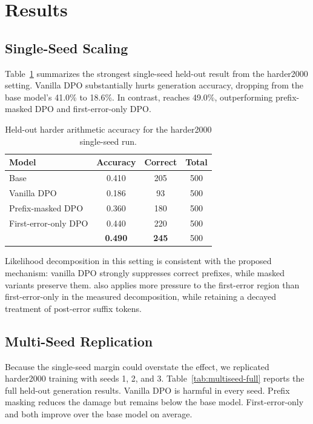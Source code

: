 \section{Results}

\subsection{Single-Seed Scaling}

Table~\ref{tab:single-seed} summarizes the strongest single-seed held-out result from the harder2000 setting. Vanilla DPO substantially hurts generation accuracy, dropping from the base model's 41.0\% to 18.6\%. In contrast, \cmdpo reaches 49.0\%, outperforming prefix-masked DPO and first-error-only DPO.

\begin{table}[t]
\caption{Held-out harder arithmetic accuracy for the harder2000 single-seed run.}
\label{tab:single-seed}
\begin{center}
\begin{tabular}{lccc}
\toprule
Model & Accuracy & Correct & Total \\
\midrule
Base & 0.410 & 205 & 500 \\
Vanilla DPO & 0.186 & 93 & 500 \\
Prefix-masked DPO & 0.360 & 180 & 500 \\
First-error-only DPO & 0.440 & 220 & 500 \\
\cmdpo{} & \textbf{0.490} & \textbf{245} & 500 \\
\bottomrule
\end{tabular}
\end{center}
\end{table}

Likelihood decomposition in this setting is consistent with the proposed mechanism: vanilla DPO strongly suppresses correct prefixes, while masked variants preserve them. \cmdpo also applies more pressure to the first-error region than first-error-only in the measured decomposition, while retaining a decayed treatment of post-error suffix tokens.

\subsection{Multi-Seed Replication}

Because the single-seed margin could overstate the effect, we replicated harder2000 training with seeds 1, 2, and 3. Table~\ref{tab:multiseed-full} reports the full held-out generation results. Vanilla DPO is harmful in every seed. Prefix masking reduces the damage but remains below the base model. First-error-only and \cmdpo both improve over the base model on average.

